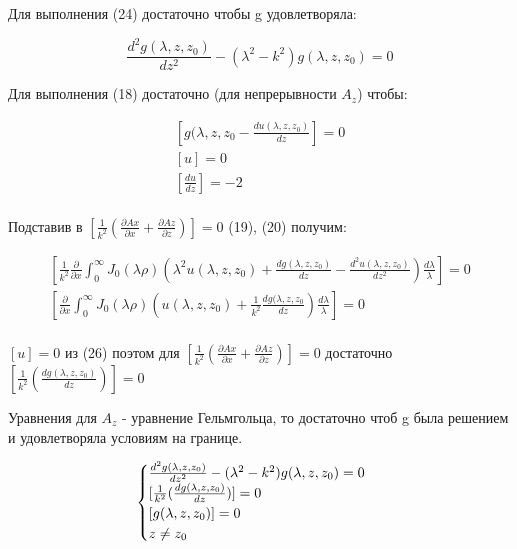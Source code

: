 	Для выполнения (24) достаточно чтобы g удовлетворяла:
	
	\begin{equation}
		\frac{d^2 g(\lambda, z, z_0)}{d z^2} - (\lambda^2 - k^2)g(\lambda, z, z_0) = 0 
	\end{equation}
	
	Для выполнения (18) достаточно (для непрерывности $A_z$) чтобы:
	
	\begin{equation}
		\begin{aligned}
			[g(\lambda, z, z_0 - \frac{du(\lambda, z, z_0)}{dz}] = 0 \\ [u] = 0 \\ [\frac{du}{dz}] = -2 \\ 
		\end{aligned}
	\end{equation}
	
	Подставив в $ [\frac{1}{k^2}( \frac{\partial Ax}{\partial x} + \frac{\partial Az}{\partial z})] = 0$ (19), (20)  получим:
	
	\begin{equation}
		\begin{aligned}
			[\frac{1}{k^2}\frac{\partial}{\partial x} \int_0^\infty J_0(\lambda \rho) (\lambda^2u(\lambda, z, z_0) + \frac{dg(\lambda, z, z_0)}{dz} - \frac{d^2 u(\lambda, z, z_0)}{d z^2}) \frac{d\lambda}{\lambda}] = 0 \\                                   [\frac{\partial}{\partial x} \int_0^\infty J_0(\lambda \rho) (u(\lambda, z, z_0) + \frac{1}{k^2} \frac{dg(\lambda, z, z_0}{dz})\frac{d\lambda}{\lambda}] = 0 \\ 
		\end{aligned}
	\end{equation}
	
	$[u] = 0$ из  (26) поэтом для  $[\frac{1}{k^2}( \frac{\partial Ax}{\partial x} + \frac{\partial Az}{\partial z})] = 0$ достаточно  $[\frac{1}{k^2}( \frac{dg(\lambda, z, z_0)}{dz})] = 0$
	
	Уравнения для $A_z$ - уравнение Гельмгольца,
	то достаточно чтоб g была решением и удовлетворяла условиям на границе.
	
	\begin{equation}
		\begin{cases}\frac{d^2 g(\lambda, z, z_0)}{d z^2} - (\lambda^2 - k^2)g(\lambda, z, z_0) = 0  \\  [\frac{1}{k^2}( \frac{dg(\lambda, z, z_0)}{dz})] = 0 \\ [g(\lambda, z, z_0)] = 0 \\ z \neq z_0 \end{cases} \\ 
	\end{equation}
	
